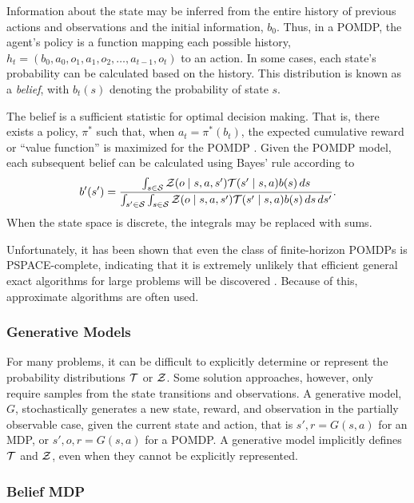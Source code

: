 Information about the state may be inferred from the entire history of previous actions and observations and the initial information, $b_0$.
Thus, in a POMDP, the agent's policy is a function mapping each possible history, $h_t = (b_0, a_0, o_1, a_1, o_2, \dots, a_{t-1}, o_t)$ to an action.
In some cases, each state's probability can be calculated based on the history.
This distribution is known as a \emph{belief}, with $b_t(s)$ denoting the probability of state $s$.

The belief is a sufficient statistic for optimal decision making.
That is, there exists a policy, $\pi^*$ such that, when $a_t = \pi^*(b_t)$, the expected cumulative reward or ``value function'' is maximized for the POMDP \cite{kaelbling1998planning,kochenderfer2015decision}.
Given the POMDP model, each subsequent belief can be calculated using Bayes' rule according to
\begin{equation} \label{eqn:update}
    b'(s') = \frac{\int_{s\in\mathcal{S}} \mathcal{Z}(o \mid s, a, s') \mathcal{T}(s' \mid s, a) b(s) \, ds}
    {\int_{s'\in\mathcal{S}} \int_{s\in\mathcal{S}} \mathcal{Z}(o \mid s, a, s') \mathcal{T}(s' \mid s, a) b(s) \, ds \, ds'} \text{.}
\end{equation}
When the state space is discrete, the integrals may be replaced with sums.

Unfortunately, it has been shown that even the class of finite-horizon POMDPs is PSPACE-complete, indicating that it is extremely unlikely that efficient general exact algorithms for large problems will be discovered \cite{papadimitriou1987complexity}.
Because of this, approximate algorithms are often used.

\subsubsection{Generative Models}

For many problems, it can be difficult to explicitly determine or represent the probability distributions $\mathcal{T}$ or $\mathcal{Z}$.
Some solution approaches, however, only require samples from the state transitions and observations.
A generative model, $G$, stochastically generates a new state, reward, and observation in the partially observable case, given the current state and action, that is $s', r = G(s,a)$ for an MDP, or $s', o, r = G(s, a)$ for a POMDP.
A generative model implicitly defines $\mathcal{T}$ and $\mathcal{Z}$, even when they cannot be explicitly represented.

\subsubsection{Belief MDP}

